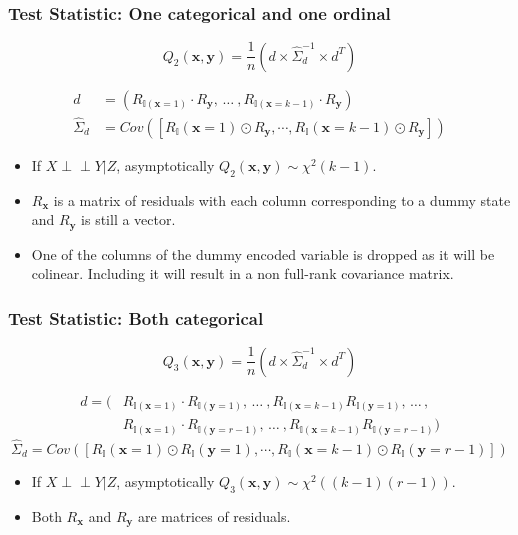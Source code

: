 \documentclass{beamer}
\def\ci{\perp\!\!\!\!\!\perp}
\begin{document}
\begin{frame}
	\frametitle{Test Statistic: One categorical and one ordinal}
	$$ Q_2(\bm{x}, \bm{y}) = \frac{1}{n} (d \times \hat{\Sigma}_d^{-1} \times d^T) $$

	\begin{equation*}
		\begin{split}
		d &= (R_{\mathbb{I}(\mathbf{x}=1)} \cdot R_{\mathbf{y}}, \, \ldots \ , R_{\mathbb{I}(\mathbf{x}=k-1)} \cdot R_{\mathbf{y}}) \\ 
		\hat{\Sigma}_d &= Cov([R_\mathbb{I}(\mathbf{x}=1) \odot R_\mathbf{y}, \cdots, R_\mathbb{I}(\mathbf{x}=k-1) \odot R_\mathbf{y}])
		\end{split}
	\end{equation*}
	\begin{center}
		\begin{itemize}
			\item If $ X \ci Y | Z $, asymptotically $ Q_2(\bm{x}, \bm{y}) \sim \chi^2(k-1) $.
			\item $ R_{\bm{x}} $ is a matrix of residuals with each column corresponding to a dummy state and $ R_{\bm{y}} $ is still a vector.
			\item One of the columns of the dummy encoded variable
				is dropped as it will be colinear. Including it will
				result in a non full-rank covariance matrix.
		\end{itemize}
	\end{center}
\end{frame}

\begin{frame}
	\frametitle{Test Statistic: Both categorical}

	$$ Q_3(\bm{x}, \bm{y}) = \frac{1}{n} (d \times \hat{\Sigma}_d^{-1} \times d^T) $$

	\begin{equation*}
		\begin{split}
		d = (&R_{\mathbb{I}(\mathbf{x}=1)} \cdot R_{\mathbb{I}(\mathbf{y}=1)}, \, \ldots \ ,
				R_{\mathbb{I}(\mathbf{x}=k-1)} R_{\mathbb{I}(\mathbf{y}=1)}, \, \ldots \, , \\
		     &R_{\mathbb{I}(\mathbf{x}=1)} \cdot R_{\mathbb{I}(\mathbf{y}=r-1)}, \, \ldots \ ,
				R_{\mathbb{I}(\mathbf{x}=k-1)} R_{\mathbb{I}(\mathbf{y}=r-1)}) 
		\end{split}
	\end{equation*}
	\begin{equation*}
		\hat{\Sigma}_d = Cov([R_\mathbb{I}(\mathbf{x}=1) \odot R_\mathbb{I}(\mathbf{y}=1), \cdots, R_\mathbb{I}(\mathbf{x}=k-1) \odot R_\mathbb{I}(\mathbf{y}=r-1)])
	\end{equation*}

	\begin{center}
		\begin{itemize}
			\item If $ X \ci Y | Z $, asymptotically $ Q_3(\bm{x}, \bm{y}) \sim \chi^2((k-1)(r-1)) $.
			\item Both $ R_{\bm{x}} $ and $ R_{\bm{y}} $ are matrices of residuals.
		\end{itemize}
	\end{center}

\end{frame}
\end{document}
